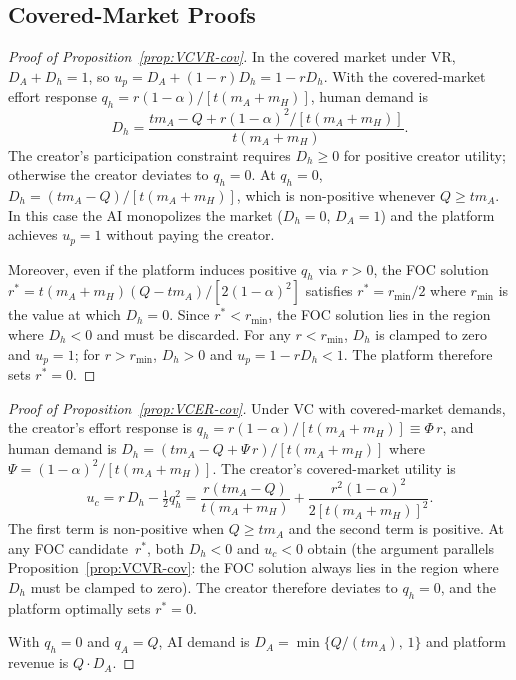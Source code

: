 \documentclass[mnsc,nonblindrev]{informs3_NoOR}
\begin{document}
 
\subsection*{Covered-Market Proofs}
 
\begin{proof}[Proof of Proposition~\ref{prop:VCVR-cov}]
In the covered market under VR, $D_A + D_h = 1$, so $u_p = D_A + (1-r)D_h = 1 - rD_h$. With the covered-market effort response $q_h = r(1-\alpha)/[t(m_A+m_H)]$, human demand is
\[
D_h = \frac{t m_A - Q + r(1-\alpha)^2/[t(m_A+m_H)]}{t(m_A+m_H)}.
\]
The creator's participation constraint requires $D_h \geq 0$ for positive creator utility; otherwise the creator deviates to $q_h = 0$. At $q_h = 0$, $D_h = (tm_A - Q)/[t(m_A + m_H)]$, which is non-positive whenever $Q \geq tm_A$. In this case the AI monopolizes the market ($D_h = 0$, $D_A = 1$) and the platform achieves $u_p = 1$ without paying the creator.

Moreover, even if the platform induces positive $q_h$ via $r > 0$, the FOC solution $r^* = t(m_A + m_H)(Q - tm_A)/[2(1-\alpha)^2]$ satisfies $r^* = r_{\min}/2$ where $r_{\min}$ is the value at which $D_h = 0$. Since $r^* < r_{\min}$, the FOC solution lies in the region where $D_h < 0$ and must be discarded. For any $r < r_{\min}$, $D_h$ is clamped to zero and $u_p = 1$; for $r > r_{\min}$, $D_h > 0$ and $u_p = 1 - rD_h < 1$. The platform therefore sets $r^* = 0$.
\end{proof}

\begin{proof}[Proof of Proposition~\ref{prop:VCER-cov}]
Under VC with covered-market demands, the creator's effort response is $q_h = r(1-\alpha)/[t(m_A+m_H)] \equiv \Phi\,r$, and human demand is $D_h = (tm_A - Q + \Psi\,r)/[t(m_A+m_H)]$ where $\Psi = (1-\alpha)^2/[t(m_A+m_H)]$. The creator's covered-market utility is
\[
u_c = r\,D_h - \tfrac{1}{2}q_h^2 = \frac{r(tm_A - Q)}{t(m_A+m_H)} + \frac{r^2(1-\alpha)^2}{2[t(m_A+m_H)]^2}.
\]
The first term is non-positive when $Q \geq tm_A$ and the second term is positive. At any FOC candidate~$r^*$, both $D_h < 0$ and $u_c < 0$ obtain (the argument parallels Proposition~\ref{prop:VCVR-cov}: the FOC solution always lies in the region where $D_h$ must be clamped to zero). The creator therefore deviates to $q_h = 0$, and the platform optimally sets $r^* = 0$.

With $q_h = 0$ and $q_A = Q$, AI demand is $D_A = \min\{Q/(tm_A),\,1\}$ and platform revenue is $Q \cdot D_A$.
\end{proof}
\end{document}
